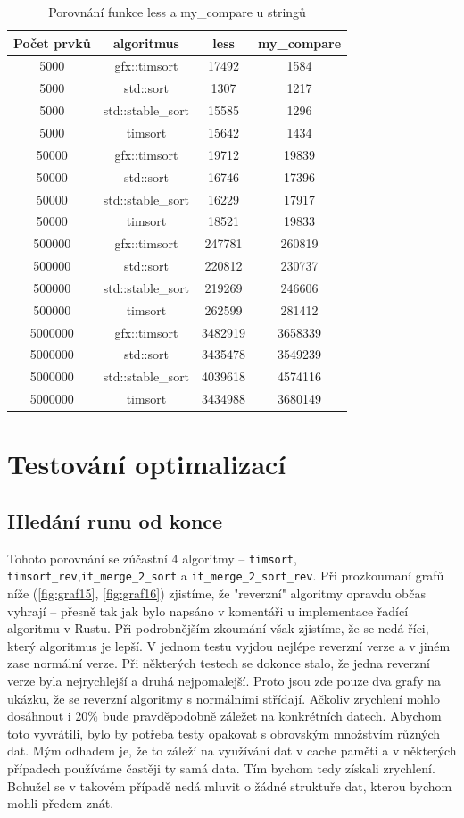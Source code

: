 \documentclass[thesis=B,czech]{FITthesis}[2019/12/23]
\begin{document}
\begin{table}[htbp]\centering
	\caption[Porovnání funkce less a my\_compare u stringů]{Porovnání funkce less a my\_compare u stringů}\label{tab:tab2}
	\begin{tabular}{|c|c|c|c|}\hline
		Počet prvků		& algoritmus		& less	& my\_compare	\tabularnewline \hline \hline
 		5000		& gfx::timsort		& 17492	& 1584		\tabularnewline \hline
 		5000		& std::sort		& 1307	& 1217		\tabularnewline \hline
 		5000		& std::stable\_sort		& 15585	& 1296		\tabularnewline \hline
 		5000		& timsort		& 15642	& 1434		\tabularnewline \hline
  		50000		& gfx::timsort		& 19712	& 19839		\tabularnewline \hline
 		50000		& std::sort		& 16746	& 17396		\tabularnewline \hline
 		50000		& std::stable\_sort		& 16229	& 17917		\tabularnewline \hline
 		50000		& timsort		& 18521	& 19833		\tabularnewline \hline
  		500000		& gfx::timsort		& 247781	& 260819		\tabularnewline \hline
 		500000		& std::sort		& 220812	& 230737		\tabularnewline \hline
 		500000		& std::stable\_sort		& 219269	& 246606		\tabularnewline \hline
 		500000		& timsort		& 262599	& 281412		\tabularnewline \hline
 		5000000		& gfx::timsort		& 3482919	& 3658339		\tabularnewline \hline
 		5000000		& std::sort		& 3435478	& 3549239		\tabularnewline \hline
 		5000000		& std::stable\_sort		& 4039618	& 4574116		\tabularnewline \hline
 		5000000		& timsort		& 3434988	& 3680149		\tabularnewline \hline
 	\end{tabular}
\end{table}

\section{Testování optimalizací}

\subsection{Hledání runu od konce}

Tohoto porovnání se zúčastní 4 algoritmy -- \texttt{timsort}, \texttt{timsort\_rev},\linebreak \texttt{it\_merge\_2\_sort} a \texttt{it\_merge\_2\_sort\_rev}. Při prozkoumaní grafů níže (\ref{fig:graf15}, \ref{fig:graf16}) zjistíme, že "reverzní" algoritmy opravdu občas vyhrají -- přesně tak jak bylo napsáno v komentáři u implementace řadící algoritmu v Rustu. Při podrobnějším zkoumání však zjistíme, že se nedá říci, který algoritmus je lepší. V jednom testu vyjdou nejlépe reverzní verze a v jiném zase normální verze. Při některých testech se dokonce stalo, že jedna reverzní verze byla nejrychlejší a druhá nejpomalejší. Proto jsou zde pouze dva grafy na ukázku, že se reverzní algoritmy s normálními střídají. Ačkoliv zrychlení mohlo dosáhnout i 20\% bude pravděpodobně záležet na konkrétních datech. Abychom toto vyvrátili, bylo by potřeba testy opakovat s obrovským množstvím různých dat. Mým odhadem je, že to záleží na využívání dat v cache paměti a v některých případech používáme častěji ty samá data. Tím bychom tedy získali zrychlení. Bohužel se v takovém případě nedá mluvit o žádné struktuře dat, kterou bychom mohli předem znát. 
\end{document}
